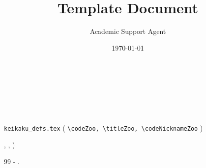 \documentclass{article}
\title{Template Document}
\author{Academic Support Agent}
\date{\today}
\begin{document}
\maketitle


\section{ }

\JSPSInstructions	%

\textbf{\\ \\
 \\
 }

\subsection{ }
         \texttt{keikaku\_defs.tex} 
        ( 
        \texttt{\textbackslash codeZoo, \textbackslash titleZoo, \textbackslash codeNicknameZoo} ) 
         
         \codeZoo, \titleZoo, \codeNicknameZoo)
         
        

	  

	 




	\vspace{1cm}
	\begin{thebibliography}{99}
		   -  .
	\end{thebibliography}




\section{ }

\textbf{\\ \\
 \\
 }
\end{document}
